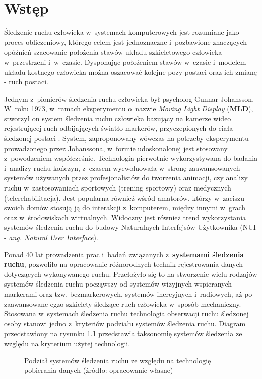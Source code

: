 
\chapter{Wstęp}\label{chap:intro}
Śledzenie ruchu człowieka w~systemach komputerowych jest rozumiane jako proces obliczeniowy, którego celem jest jednoznaczne i~pozbawione znaczących opóźnień szacowanie położenia stawów układu szkieletowego człowieka w~przestrzeni i~w~czasie. Dysponując położeniem stawów w~czasie i~modelem układu kostnego człowieka można oszacować kolejne pozy postaci oraz ich zmianę - ruch postaci.

Jednym z~pionierów śledzenia ruchu człowieka był psycholog Gunnar Johansson. W~roku 1973, w~ramach eksperymentu o~nazwie \emph{Moving Light Display} (\textbf{MLD}), stworzył on system śledzenia ruchu człowieka bazujący na kamerze wideo rejestrującej ruch odbijających światło markerów, przyczepionych do ciała śledzonej postaci \cite{Johansson1973}. System, zaproponowany wówczas na potrzeby eksperymentu prowadzonego przez Johanssona, w~formie udoskonalonej jest stosowany z~powodzeniem współcześnie. Technologia pierwotnie wykorzystywana do badania i~analizy ruchu kończyn, z~czasem wyewoluowała w~stronę zaawansowanych systemów używanych przez profesjonalistów do tworzenia animacji, czy analizy ruchu w~zastosowaniach sportowych (trening sportowy) oraz medycznych (telerehabilitacja). Jest popularna również wśród amatorów, którzy w~zaciszu swoich domów stosują ją do interakcji z~komputerem, między innymi w~grach oraz w~środowiskach wirtualnych. Widoczny jest również trend wykorzystania systemów śledzenia ruchu do budowy Naturalnych Interfejsów Użytkownika\cite{Glonek_Pietruszka_2012} (NUI - \emph{ang. Natural User Interface}).

Ponad 40 lat prowadzenia prac i~badań związanych z~\textbf{systemami śledzenia ruchu}, pozwoliło na opracowanie różnorodnych technik rejestrowania danych dotyczących wykonywanego ruchu. Przełożyło się to na stworzenie wielu rodzajów systemów śledzenia ruchu począwszy od systemów wizyjnych wspieranych markerami oraz tzw. bezmarkerowych, systemów inercyjnych i~radiowych, aż po zaawansowane egzo-szkielety śledzące ruch człowieka w~sposób mechaniczny. Stosowana w~systemach śledzenia ruchu technologia obserwacji ruchu śledzonej osoby stanowi jedno z~kryteriów podziału systemów śledzenia ruchu. Diagram przedstawiony na rysunku \ref{fig:literature:mocapSystems:diagram} przedstawia taksonomię systemów śledzenia ze względu na kryterium użytej technologii.

	\begin{figure}[!htb]
		\centering
		
		\caption{Podział systemów śledzenia ruchu ze względu na technologię pobierania danych (źródło: opracowanie własne)}
		\label{fig:literature:mocapSystems:diagram}
	\end{figure}


